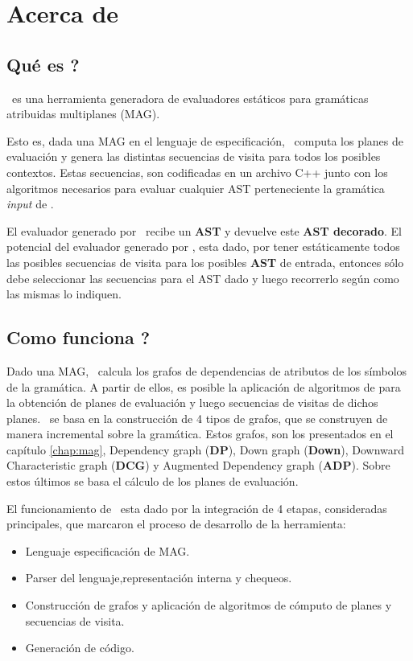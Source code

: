 \chapter{Acerca de \maggen}
\label{chap:acercamaggen}
\minitoc

\section{\textquestiondown Qué es \maggen?}
\maggen\ es una herramienta generadora de evaluadores estáticos para gramáticas atribuidas multiplanes (MAG). 

Esto es, dada una MAG en el lenguaje de especificación, \maggen\ computa los planes de evaluación y genera las distintas secuencias de visita para todos los posibles contextos. Estas secuencias, son codificadas en un archivo C++ junto con los algoritmos necesarios para evaluar cualquier AST perteneciente la gramática \textit{input} de \maggen.

El evaluador generado por \maggen\ recibe un \textbf{AST} y devuelve este \textbf{AST decorado}. El potencial del evaluador generado por \maggen, esta dado, por tener estáticamente todos las posibles secuencias de visita para los posibles \textbf{AST} de entrada, entonces sólo debe seleccionar las secuencias para el AST dado y luego recorrerlo según como las mismas lo indiquen.

\section{\textquestiondown Como funciona \maggen ?}
Dado una MAG, \maggen\ calcula los grafos de dependencias de atributos de los símbolos de la gramática. A partir de ellos, es posible la aplicación de algoritmos de para la obtención de planes de evaluación y luego secuencias de visitas de dichos planes. \maggen\ se basa en la construcción de 4 tipos de grafos, que se construyen de manera incremental sobre la gramática. Estos grafos, son los presentados en el capítulo \ref{chap:mag}, Dependency graph (\textbf{DP}), Down graph (\textbf{Down}), Downward Characteristic graph (\textbf{DCG}) y Augmented Dependency graph (\textbf{ADP}). Sobre estos últimos se basa el cálculo de los planes de evaluación.

El funcionamiento de \maggen\ esta dado por la integración de 4 etapas, consideradas principales, que marcaron el proceso de desarrollo de la herramienta:
\begin{itemize}
\item Lenguaje especificación de MAG.
\item Parser del lenguaje,representación interna y chequeos.
\item Construcción de grafos y aplicación de algoritmos de cómputo de planes y secuencias de visita.
\item Generación de código.
\end{itemize}

